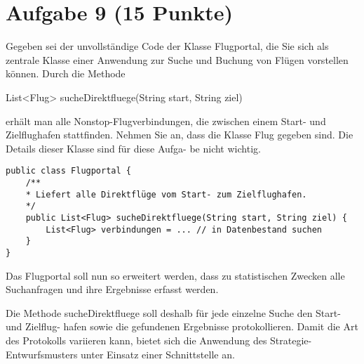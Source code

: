 \section{Aufgabe 9 (15 Punkte)}
Gegeben sei der unvollständige Code der Klasse Flugportal, die Sie sich als
zentrale Klasse einer Anwendung zur Suche und Buchung von Flügen vorstellen
können. Durch die Methode

List<Flug> sucheDirektfluege(String start, String ziel)

erhält man alle Nonstop-Flugverbindungen, die zwischen einem Start- und
Zielflughafen stattfinden. Nehmen Sie an, dass die Klasse Flug gegeben sind.
Die Details dieser Klasse sind für diese Aufga- be nicht wichtig.

\begin{lstlisting}
public class Flugportal {
    /**
    * Liefert alle Direktflüge vom Start- zum Zielflughafen.
    */
    public List<Flug> sucheDirektfluege(String start, String ziel) {
        List<Flug> verbindungen = ... // in Datenbestand suchen
    }
}
\end{lstlisting}

Das Flugportal soll nun so erweitert werden, dass zu statistischen Zwecken alle
Suchanfragen und ihre Ergebnisse erfasst werden.

Die Methode sucheDirektfluege soll deshalb für jede einzelne Suche den Start-
und Zielflug- hafen sowie die gefundenen Ergebnisse protokollieren. Damit die
Art des Protokolls variieren kann, bietet sich die Anwendung des
Strategie-Entwurfsmusters unter Einsatz einer Schnittstelle an.

